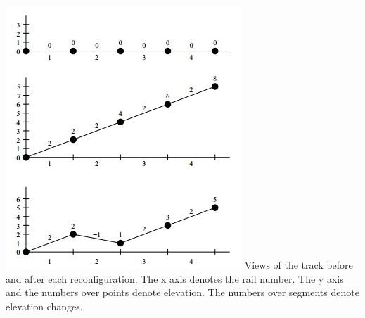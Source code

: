 \includegraphics{mountain.png}
Views of the track before and after each reconfiguration. The x axis denotes the rail number. The y axis and
the numbers over points denote elevation. The numbers over segments denote elevation changes.
